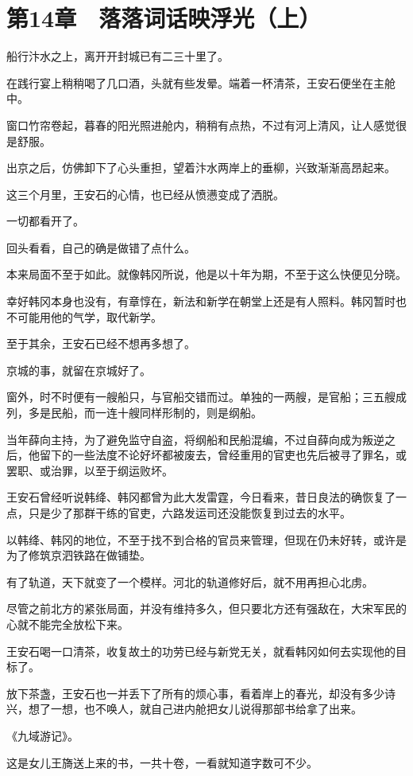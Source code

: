 \section{第14章　落落词话映浮光（上）}

船行汴水之上，离开开封城已有二三十里了。

在践行宴上稍稍喝了几口酒，头就有些发晕。端着一杯清茶，王安石便坐在主舱中。

窗口竹帘卷起，暮春的阳光照进舱内，稍稍有点热，不过有河上清风，让人感觉很是舒服。

出京之后，仿佛卸下了心头重担，望着汴水两岸上的垂柳，兴致渐渐高昂起来。

这三个月里，王安石的心情，也已经从愤懑变成了洒脱。

一切都看开了。

回头看看，自己的确是做错了点什么。

本来局面不至于如此。就像韩冈所说，他是以十年为期，不至于这么快便见分晓。

幸好韩冈本身也没有，有章惇在，新法和新学在朝堂上还是有人照料。韩冈暂时也不可能用他的气学，取代新学。

至于其余，王安石已经不想再多想了。

京城的事，就留在京城好了。

窗外，时不时便有一艘船只，与官船交错而过。单独的一两艘，是官船；三五艘成列，多是民船，而一连十艘同样形制的，则是纲船。

当年薛向主持，为了避免监守自盗，将纲船和民船混编，不过自薛向成为叛逆之后，他留下的一些法度不论好坏都被废去，曾经重用的官吏也先后被寻了罪名，或罢职、或治罪，以至于纲运败坏。

王安石曾经听说韩绛、韩冈都曾为此大发雷霆，今日看来，昔日良法的确恢复了一点，只是少了那群干练的官吏，六路发运司还没能恢复到过去的水平。

以韩绛、韩冈的地位，不至于找不到合格的官员来管理，但现在仍未好转，或许是为了修筑京泗铁路在做铺垫。

有了轨道，天下就变了一个模样。河北的轨道修好后，就不用再担心北虏。

尽管之前北方的紧张局面，并没有维持多久，但只要北方还有强敌在，大宋军民的心就不能完全放松下来。

王安石喝一口清茶，收复故土的功劳已经与新党无关，就看韩冈如何去实现他的目标了。

放下茶盏，王安石也一并丢下了所有的烦心事，看着岸上的春光，却没有多少诗兴，想了一想，也不唤人，就自己进内舱把女儿说得那部书给拿了出来。

《九域游记》。

这是女儿王旖送上来的书，一共十卷，一看就知道字数可不少。

